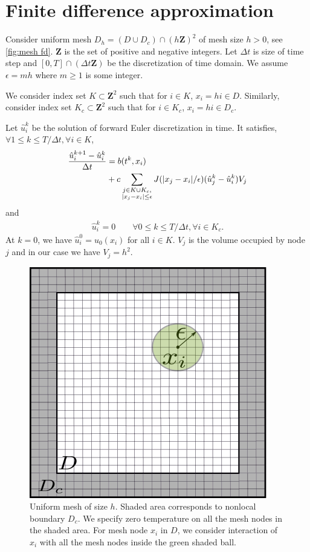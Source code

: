 \documentclass[11pt,twocolumn]{amsart}
\theoremstyle{definition}
\theoremstyle{definition}
\numberwithin{equation}{section}
\numberwithin{equation}{section}
\newcommand{\Z}{\mathbf{Z}}  %
\begin{document}
\section{Finite difference approximation}\label{s:fd}
Consider uniform mesh $D_h = (D\cup D_c)\cap (h\Z)^2$ of mesh size $h >0$, see \autoref{fig:mesh fd}. $\Z$ is the set of positive and negative integers. Let $\Delta t$ is size of time step and $[0,T]\cap (\Delta t \Z)$ be the discretization of time domain. We assume $\epsilon = m h$ where $m\geq 1$ is some integer.

We consider index set $K \subset \Z^2$ such that for $i\in K$, $x_i = h i \in D$. Similarly, consider index set $K_c \subset \Z^2$ such that for $i\in K_c$, $x_i = h i \in D_c$.

Let $\hat{u}^k_i$ be the solution of forward Euler discretization in time. It satisfies,$\forall 1\leq k \leq T/\Delta t, \forall i \in K$,
\begin{align}\label{eq:forward fd}
\dfrac{\hat{u}^{k+1}_i - \hat{u}^k_i}{\Delta t} &= b(t^k, x_i) \notag \\
&+ c \sum_{\substack{j \in K\cup K_c,\\
|x_j-x_i| \leq \epsilon}} J(|x_j - x_i|/\epsilon) (\hat{u}^k_j - \hat{u}^k_i) V_j
\end{align}
and
\begin{align}
\hat{u}^k_i = 0 \qquad \forall 0\leq k \leq T/\Delta t, \forall i \in K_c.
\end{align}
At $k=0$, we have $\hat{u}^0_i = u_0(x_i)$ for all $i\in K$. $V_j$ is the volume occupied by node $j$ and in our case we have $V_j = h^2$. 

\begin{figure}[ht]
\centering
\includegraphics[scale=0.6]{mesh_uniform.png}
\caption{Uniform mesh of size $h$. Shaded area corresponds to nonlocal boundary $D_c$. We specify zero temperature on all the mesh nodes in the shaded area. For mesh node $x_i$ in $D$, we consider interaction of $x_i$ with all the mesh nodes inside the green shaded ball.}\label{fig:mesh fd}
\end{figure}
\end{document}
